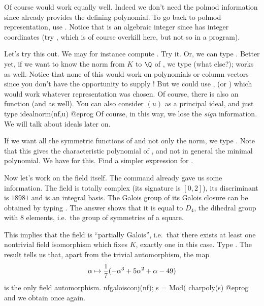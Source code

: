 Of course  would work equally well. Indeed
we don't need the polmod information since  already provides the
defining polynomial. To go back to polmod representation, use
. Notice that  is an algebraic integer since
 has integer coordinates (try , which is of
course overkill here, but not so in a program).

Let's try this out. We may for instance compute . Try it. Or, we
can type . Better yet, if we want to know the norm from $K$ to $\Q$
of , we type  (what else?);  works as well.
Notice that none of this would work on polynomials or column vectors since
you don't have the opportunity to supply ! But we could use
,  (or )
which would work whatever representation was chosen. Of course,
there is also an  function (and  as well).
You can also consider $(u)$ as a principal ideal, and just type
\bprog
  idealnorm(nf,u)
@eprog\noindent
Of course, in this way, we lose the \emph{sign} information. We will talk
about ideals later on.

  If we want all the symmetric functions of  and not only the norm, we
type . Note that this gives the characteristic polynomial of
, and not in general the minimal polynomial. We have 
for this.
 Find a simpler expression for . \smallskip

  Now let's work on the field itself. The  command already
gave us some information. The field is totally complex (its signature
 is $[0,2]$), its discriminant  is $18981$ and
 is an integral basis. The Galois group of its Galois closure
can be obtained by typing . The answer \kbd{[8,-1,1,"D(4)"]}
shows that it is equal to $D_4$, the dihedral group with 8 elements,
i.e.~the group of symmetries of a square.

This implies that the field is ``partially Galois'', i.e.~that there exists
at least one nontrivial field isomorphism which fixes $K$, exactly one in
this case. Type . The result tells us that, apart from
the trivial automorphism, the map
$$\alpha \mapsto {1\over7}(-\alpha^3+5\alpha^2+\alpha-49)$$
is the only field automorphism.
\bprog
  nfgaloisconj(nf);
  s = Mod(%
  charpoly(s)
@eprog\noindent
and we obtain  once again.

